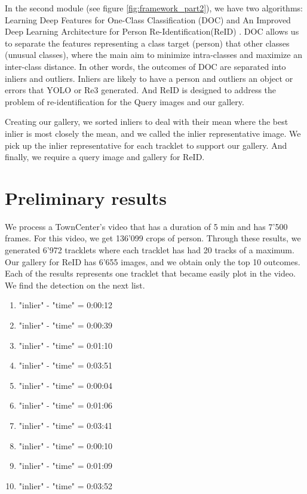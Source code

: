 \documentclass[a4paper]{article}
\begin{document}
\leavevmode\newline

In the second module (see figure \ref{fig:framework_part2}), we have two algorithms: Learning Deep Features for One-Class Classification (DOC) \cite{DOC} and An Improved Deep Learning Architecture for Person Re-Identification(ReID) \cite{REID}.  DOC allows us to separate the features representing a class target (person) that other classes (unusual classes), where the main aim to minimize intra-classes and maximize an inter-class distance. In other words, the outcomes of DOC are separated into inliers and outliers. Inliers are likely to have a person and outliers an object or errors that YOLO or Re3 generated. And ReID is designed to address the problem of re-identification for the Query images and our gallery. 

\leavevmode\newline

Creating our gallery, we sorted inliers to deal with their mean where the best inlier is most closely the mean, and we called the inlier representative image. We pick up the inlier representative for each tracklet to support our gallery. And finally, we require a query image and gallery for ReID.

\section{Preliminary results}
We process a TownCenter's video that has a duration of 5 min and has 7'500 frames. For this video, we get 136'099 crops of person. Through these results, we generated 6'972 tracklets where each tracklet has had 20 tracks of a maximum. 
Our gallery for ReID has 6'655 images, and we obtain only the top 10 outcomes. Each of the results represents one tracklet that became easily plot in the video. We find the detection on the next list.


\begin{enumerate}
    \item "inlier" - "time" = 0:00:12
    \item "inlier" - "time" = 0:00:39
    \item "inlier" - "time" = 0:01:10
    \item "inlier" - "time" = 0:03:51
    \item "inlier" - "time" = 0:00:04
    \item "inlier" - "time" = 0:01:06
    \item "inlier" - "time" = 0:03:41
    \item "inlier" - "time" = 0:00:10
    \item "inlier" - "time" = 0:01:09
    \item "inlier" - "time" = 0:03:52
\end{enumerate}
\end{document}

